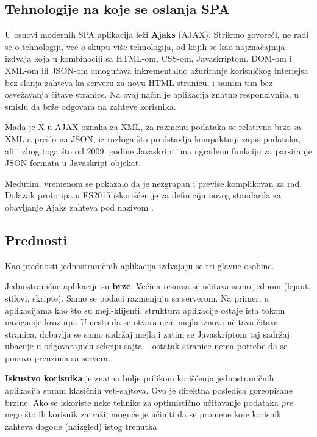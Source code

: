 \subsection{Tehnologije na koje se oslanja SPA}

U osnovi modernih SPA aplikacija leži \textbf{Ajaks} (AJAX).
Striktno govoreći, ne radi se o tehnologiji, već o skupu više tehnologija, od kojih se kao najznačajnija izdvaja  koja u kombinaciji sa HTML-om, CSS-om, Javaskriptom, DOM-om i XML-om ili JSON-om omogućava inkrementalno ažuriranje korisničkog interfejsa bez slanja zahteva ka serveru za novu HTML stranicu, i samim tim bez osvežavanja čitave stranice.
Na ovaj način je aplikacija znatno responzivnija, u smislu da brže odgovara na zahteve korisnika.

Mada je X u AJAX oznaka za XML, za razmenu podataka se relativno brzo sa XML-a prešlo na JSON, iz razloga što predstavlja kompaktniji zapis podataka, ali
i zbog toga što od 2009. godine Javaskript ima ugradenu funkciju za parsiranje JSON formata u Javaskript objekat.

Međutim, vremenom se pokazalo da je  nezgrapan i previše komplikovan za rad.
Dolazak prototipa  u ES2015 iskorišćen je za definiciju novog standarda za obavljanje Ajaks zahteva pod nazivom .

\subsection{Prednosti}

Kao prednosti jednostraničnih aplikacija izdvajaju se tri glavne osobine.

Jednostranične aplikacije su \textbf{brze}.
Većina resursa se učitava samo jednom (lejaut, stilovi, skripte).
Samo se podaci razmenjuju sa serverom.
Na primer, u aplikacijama kao što su mejl-klijenti, struktura aplikacije ostaje ista tokom navigacije kroz nju.
Umesto da se otvaranjem mejla iznova učitava čitava stranica, dobavlja se samo sadržaj mejla i zatim se Javaskriptom taj sadržaj ubacuje u odgovarajuću sekciju sajta -- ostatak stranice nema potrebe da se ponovo preuzima sa servera.

\textbf{Iskustvo korisnika} je znatno bolje prilikom korišćenja jednostraničnih aplikacija spram klasičnih veb-sajtova.
Ovo je direktna posledica goreopisane brzine.
Ako se iskoriste neke tehnike za optimistično učitavanje podataka \textit{pre} nego što ih korisnik zatraži, moguće je učiniti da se promene koje korisnik zahteva dogode (naizgled) istog trenutka.

